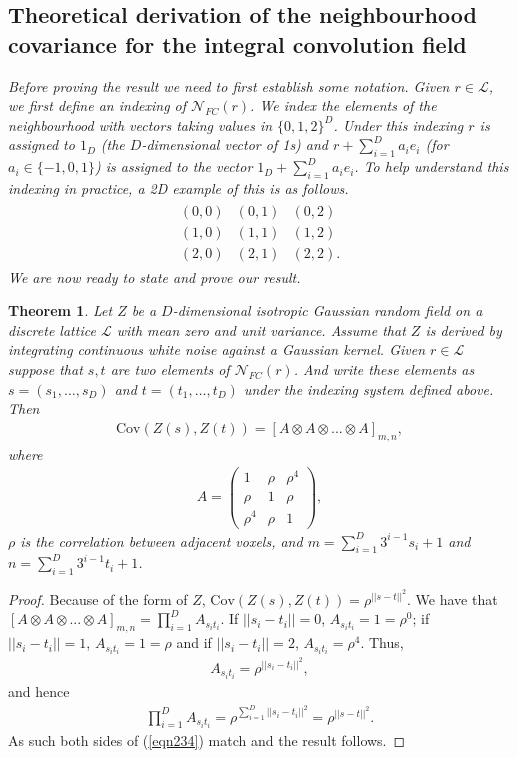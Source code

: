 \documentclass{article}
\newtheorem{theorem}{Theorem}
\newcommand{\Cov}{\mathrm{Cov}}
\newcommand{\nt}[1]{\textit{\color{red} #1}}
\begin{document}
\subsection{Theoretical derivation of the neighbourhood covariance for the integral convolution field}\label{appendix.B.1}
\nt{Before proving the result we need to first establish some notation. Given $r \in \mathcal{L}$, we first define an indexing of $\mathcal{N}_{FC}(r)$. We index the elements of the neighbourhood with vectors taking values in $\lbrace0, 1, 2\rbrace^D$. Under this indexing $r$ is assigned to $1_D$ (the $D$-dimensional vector of 1s) and $r + \sum_{i = 1}^D a_i e_i$ (for $a_i \in \lbrace-1,0,1\rbrace$) is assigned to the vector $1_D + \sum_{i = 1}^D a_i e_i$. To help understand this indexing in practice, a 2D example of this is as follows.
\begin{align*}
	\begin{matrix}
		(0,0) & (0,1) & (0,2)\\
		(1,0) & (1,1) & (1,2)\\
		(2,0) & (2,1) & (2,2).
	\end{matrix}
\end{align*}
We are now ready to state and prove our result.}
\begin{theorem}\label{thm:thm}
	\nt{Let $Z$ be a $D$-dimensional isotropic Gaussian random field on a discrete lattice $\mathcal{L}$ with mean zero and unit variance. Assume that $Z$ is derived by integrating continuous white noise against a Gaussian kernel. Given $r \in \mathcal{L}$ suppose that $s, t$ are two elements of $\mathcal{N}_{FC}(r)$. And write these elements as $s = (s_1, \dots, s_D)$ and $t = (t_1, \dots, t_D)$ under the indexing system defined above.} Then
	\begin{align}\label{eqn234}
		\mathrm{Cov}(Z(s),Z(t)) = \left[A\otimes A \otimes... \otimes A\right]_{m,n},
	\end{align}
	where
	\begin{align*}
		A = \begin{pmatrix}
			1 & \rho & \rho^4\\
			\rho & 1 & \rho\\
			\rho^4 & \rho & 1
		\end{pmatrix},
	\end{align*}
	$\rho$ is the correlation between adjacent voxels, and $m = \sum_{i=1}^D 3^{i-1}s_{i}+1$ and $n = \sum_{i=1}^D 3^{i-1}t_{i}+1$.
\end{theorem}
\begin{proof} Because of the form of $Z$, $\Cov(Z(s), Z(t)) = \rho^{||s-t||^2}$. We have that $\left[A\otimes A \otimes... \otimes A\right]_{m,n} = \prod_{i=1}^D A_{s_it_i}$. If $||s_i-t_i|| = 0$, $A_{s_it_i} = 1 = \rho^0$; if $||s_i-t_i|| = 1$, $A_{s_it_i} = 1 = \rho$ and if $||s_i-t_i|| = 2$, $A_{s_it_i} = \rho^4$. Thus, 
\begin{align*}
    A_{s_it_i} = \rho^{||s_i-t_i||^2} ,
\end{align*}
and hence
\begin{align*}
\prod_{i=1}^D A_{s_it_i} = \rho^{\sum_{i=1}^D||s_i-t_i||^2} = \rho^{||s-t||^2}.
\end{align*}
As such both sides of (\ref{eqn234}) match and the result follows.
\end{proof}
\end{document}
